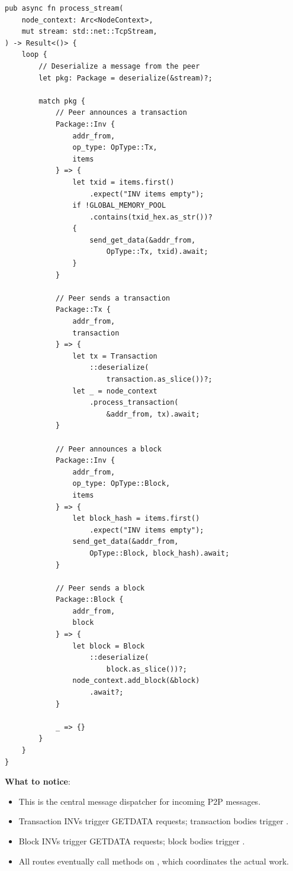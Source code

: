 \begin{listing}[htbp]
\caption{P2P message dispatcher ()}
\label{lst:9-8-5}
\begin{verbatim}
pub async fn process_stream(
    node_context: Arc<NodeContext>,
    mut stream: std::net::TcpStream,
) -> Result<()> {
    loop {
        // Deserialize a message from the peer
        let pkg: Package = deserialize(&stream)?;

        match pkg {
            // Peer announces a transaction
            Package::Inv {
                addr_from,
                op_type: OpType::Tx,
                items
            } => {
                let txid = items.first()
                    .expect("INV items empty");
                if !GLOBAL_MEMORY_POOL
                    .contains(txid_hex.as_str())?
                {
                    send_get_data(&addr_from,
                        OpType::Tx, txid).await;
                }
            }

            // Peer sends a transaction
            Package::Tx {
                addr_from,
                transaction
            } => {
                let tx = Transaction
                    ::deserialize(
                        transaction.as_slice())?;
                let _ = node_context
                    .process_transaction(
                        &addr_from, tx).await;
            }

            // Peer announces a block
            Package::Inv {
                addr_from,
                op_type: OpType::Block,
                items
            } => {
                let block_hash = items.first()
                    .expect("INV items empty");
                send_get_data(&addr_from,
                    OpType::Block, block_hash).await;
            }

            // Peer sends a block
            Package::Block {
                addr_from,
                block
            } => {
                let block = Block
                    ::deserialize(
                        block.as_slice())?;
                node_context.add_block(&block)
                    .await?;
            }

            _ => {}
        }
    }
}
\end{verbatim}
\end{listing}

\textbf{What to notice}:
\begin{itemize}
  \item This is the central message dispatcher for incoming P2P messages.
  \item Transaction INVs trigger GETDATA requests; transaction bodies trigger .
  \item Block INVs trigger GETDATA requests; block bodies trigger .
  \item All routes eventually call methods on , which coordinates the actual work.
\end{itemize}

